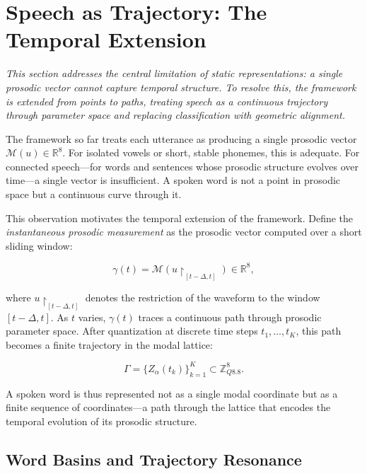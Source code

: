 \documentclass[12pt, a4paper]{article}
\begin{document}
\section{Speech as Trajectory: The Temporal Extension}

\noindent\textit{This section addresses the central limitation of static representations: a single prosodic vector cannot capture temporal structure. To resolve this, the framework is extended from points to paths, treating speech as a continuous trajectory through parameter space and replacing classification with geometric alignment.}


The framework so far treats each utterance as producing a single prosodic vector $\mathcal{M}(u) \in \mathbb{R}^8$. For isolated vowels or short, stable phonemes, this is adequate. For connected speech---for words and sentences whose prosodic structure evolves over time---a single vector is insufficient. A spoken word is not a point in prosodic space but a continuous curve through it.

This observation motivates the temporal extension of the framework. Define the \emph{instantaneous prosodic measurement} as the prosodic vector computed over a short sliding window:

\begin{equation}
\gamma(t) = \mathcal{M}(u\!\upharpoonright_{[t-\Delta, t]}) \in \mathbb{R}^8,
\label{eq:gamma}
\end{equation}

where $u\!\upharpoonright_{[t-\Delta, t]}$ denotes the restriction of the waveform to the window $[t - \Delta, t]$. As $t$ varies, $\gamma(t)$ traces a continuous path through prosodic parameter space. After quantization at discrete time steps $t_1, \ldots, t_K$, this path becomes a finite trajectory in the modal lattice:

\begin{equation}
\Gamma = \{Z_\alpha(t_k)\}_{k=1}^K \subset \mathbb{Z}_{Q8.8}^8.
\label{eq:traj}
\end{equation}

A spoken word is thus represented not as a single modal coordinate but as a finite sequence of coordinates---a path through the lattice that encodes the temporal evolution of its prosodic structure.

\subsection{Word Basins and Trajectory Resonance}
\end{document}
